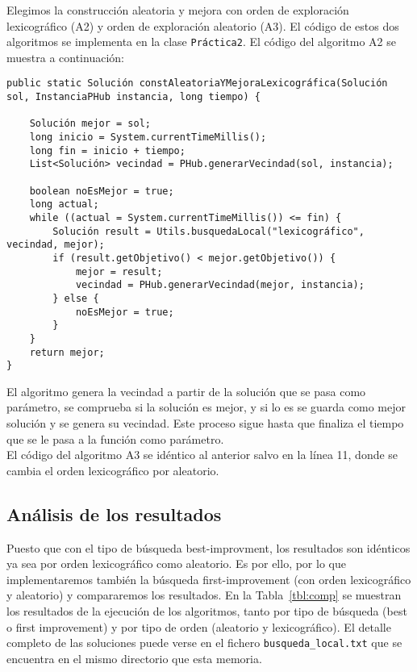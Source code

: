 \documentclass[12pt,a4paper,twoside,openright,titlepage,final]{article}
\begin{document}
Elegimos la construcción aleatoria y mejora con orden de exploración lexicográfico (A2) y orden de exploración aleatorio (A3). El código de estos dos algoritmos se implementa en la clase \texttt{Práctica2}. El código del algoritmo A2 se muestra a continuación:

\begin{verbatim}
public static Solución constAleatoriaYMejoraLexicográfica(Solución sol, InstanciaPHub instancia, long tiempo) {

    Solución mejor = sol;
    long inicio = System.currentTimeMillis();
    long fin = inicio + tiempo;
    List<Solución> vecindad = PHub.generarVecindad(sol, instancia);

    boolean noEsMejor = true;
    long actual;
    while ((actual = System.currentTimeMillis()) <= fin) {
        Solución result = Utils.busquedaLocal("lexicográfico", vecindad, mejor);
        if (result.getObjetivo() < mejor.getObjetivo()) {
            mejor = result;
            vecindad = PHub.generarVecindad(mejor, instancia);				
        } else {
            noEsMejor = true;
        }
    }
    return mejor;
}

\end{verbatim}

El algoritmo genera la vecindad a partir de la solución que se pasa como parámetro, se comprueba si la solución es mejor, y si lo es se guarda como mejor solución y se genera su vecindad. Este proceso sigue hasta que finaliza el tiempo que se le pasa a la función como parámetro.\\

El código del algoritmo A3 se idéntico al anterior salvo en la línea 11, donde se cambia el orden lexicográfico por aleatorio.


\subsection{Análisis de los resultados}

Puesto que con el tipo de búsqueda best-improvment, los resultados son idénticos ya sea por orden lexicográfico como aleatorio. Es por ello, por lo que implementaremos también la búsqueda first-improvement (con orden lexicográfico y aleatorio) y compararemos los resultados. En la Tabla~\ref{tbl:comp} se muestran los resultados de la ejecución de los algoritmos, tanto por tipo de búsqueda (best o first improvement) y por tipo de orden (aleatorio y lexicográfico). El detalle completo de las soluciones puede verse en el fichero \texttt{busqueda\_local.txt} que se encuentra en el mismo directorio que esta memoria.\\
\end{document}
